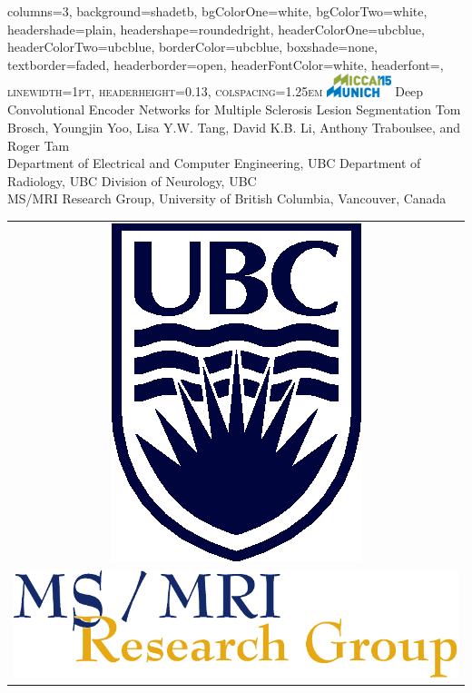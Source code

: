 \documentclass[%
landscape,
a0paper,
margin=2cm,
fontscale=0.3
]{baposter}
\begin{document}
\begin{poster}{
  columns=3,
  background=shadetb,
  bgColorOne=white,
  bgColorTwo=white,
  headershade=plain,
  headershape=roundedright,
  headerColorOne=ubcblue,
  headerColorTwo=ubcblue,
  borderColor=ubcblue,
  boxshade=none,
  textborder=faded,
  headerborder=open,
  headerFontColor=white,
  headerfont=\scshape\Large,
  linewidth=1pt,
  headerheight=0.13\textwidth,
  colspacing=1.25em
}
{
\includegraphics[width=0.14\textwidth]{images/Logo_MICCAI15}
}
{
Deep Convolutional Encoder Networks for Multiple Sclerosis Lesion
Segmentation\vspace{0.5em} }
{
Tom Brosch,
Youngjin Yoo,
Lisa Y.W. Tang,
David K.B. Li,
Anthony Traboulsee, and
Roger Tam\\[0.65ex]
\large {}Department of Electrical and Computer Engineering, UBC\quad
{}Department of Radiology, UBC\quad
{}Division of Neurology, UBC\\[0.65ex]
MS/MRI Research Group, University of British Columbia, Vancouver, Canada
}
{
\begin{tabular}{c}
\\
\includegraphics[height=0.07\textwidth]{images/s4b282c}\\
\addlinespace
\includegraphics[height=0.03\textwidth]{images/msmri_simple}
\end{tabular}
}


\end{poster}
\end{document}
